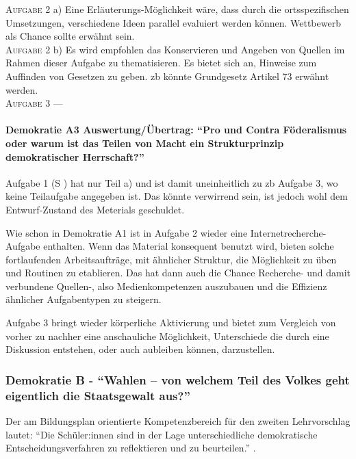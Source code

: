 \textsc{Aufgabe 2} a) \quad
Eine Erläuterungs-Möglichkeit wäre, dass durch die ortsspezifischen Umsetzungen, verschiedene Ideen parallel evaluiert werden können. 
Wettbewerb als Chance sollte erwähnt sein. 
\\

\textsc{Aufgabe 2} b) \quad
Es wird empfohlen das Konservieren und Angeben von Quellen im Rahmen dieser Aufgabe zu thematisieren.
Es bietet sich an, Hinweise zum Auffinden von Gesetzen zu geben. \Gls{zb} könnte Grundgesetz Artikel 73 erwähnt werden.
\\

\textsc{Aufgabe 3} \quad
---


\paragraph{Demokratie A3 Auswertung/Übertrag: \enquote{Pro und Contra Föderalismus oder warum ist das Teilen von Macht ein Strukturprinzip demokratischer Herrschaft?}}
Aufgabe 1 (\gls{S} \pageref{DEMOKRATIE-A3}) hat nur Teil a) und ist damit uneinheitlich zu \gls{zb} Aufgabe 3, wo keine Teilaufgabe angegeben ist. Das könnte verwirrend sein, ist jedoch wohl dem Entwurf-Zustand des Meterials geschuldet. 

Wie schon in Demokratie A1 ist in Aufgabe 2 wieder eine Internetrecherche-Aufgabe enthalten. Wenn das Material konsequent benutzt wird, bieten solche fortlaufenden Arbeitsaufträge, mit ähnlicher Struktur, die Möglichkeit zu üben und Routinen zu etablieren. Das hat dann auch die Chance   Recherche- und damit verbundene Quellen-, also Medienkompetenzen auszubauen und die Effizienz ähnlicher Aufgabentypen zu steigern.

Aufgabe 3 bringt wieder körperliche Aktivierung und bietet zum Vergleich von vorher zu nachher eine anschauliche Möglichkeit, Unterschiede die durch eine Diskussion entstehen, oder auch aubleiben können, darzustellen. 



\subsubsection{Demokratie B - \enquote{Wahlen – von welchem Teil des Volkes geht eigentlich die Staatsgewalt aus?}}
Der am Bildungsplan orientierte Kompetenzbereich für den zweiten Lehrvorschlag %
lautet: \enquote{Die Schüler:innen sind in der Lage unterschiedliche demokratische Entscheidungsverfahren zu reflektieren und zu beurteilen.} \autocite[][16]{bplan}. 

